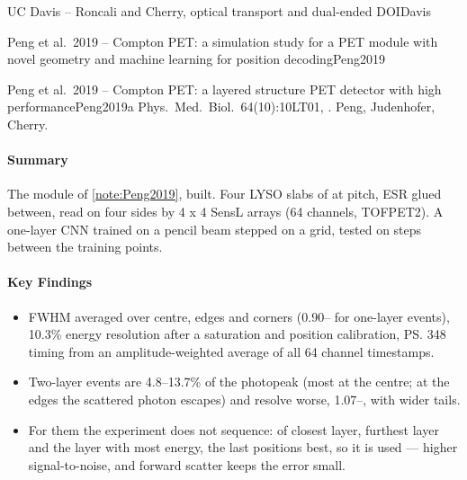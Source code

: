 \begin{programnote}{UC Davis -- Roncali and Cherry, optical transport and dual-ended DOI}{Davis}
\begin{papernote}{Peng et al.\ 2019 -- Compton PET: a simulation study for a PET module with novel geometry and machine learning for position decoding}{Peng2019}
\end{papernote}

\begin{papernote}{Peng et al.\ 2019 -- Compton PET: a layered structure PET detector with high performance}{Peng2019a}
Phys.\ Med.\ Biol.\ 64(10):10LT01, . Peng,
Judenhofer, Cherry.

\paragraph{Summary}
The module of \ref{note:Peng2019}, built. Four LYSO slabs of
 at  pitch, ESR glued between, read
on four sides by 4 x 4 SensL arrays (64 channels, TOFPET2). A one-layer CNN
trained on a  pencil beam stepped on a  grid, tested on
 steps between the training points.

\paragraph{Key Findings}
\begin{itemize}
	\item {} FWHM averaged over centre, edges and corners
		(0.90-- for one-layer events), 10.3\% energy resolution after
		a saturation and position calibration, \ps{348} timing from an
		amplitude-weighted average of all 64 channel timestamps.
	\item Two-layer events are 4.8--13.7\% of the photopeak (most at the
		centre; at the edges the scattered photon escapes) and resolve worse,
		1.07--, with wider tails.
	\item For them the experiment does not sequence: of closest layer,
		furthest layer and the layer with most energy, the last positions best,
		so it is used --- higher signal-to-noise, and forward scatter keeps the
		error small.
\end{itemize}


\end{papernote}
\end{programnote}
